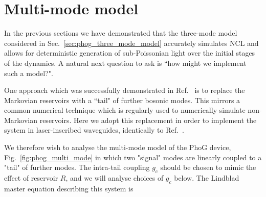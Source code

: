 



\clearpage
\section{Multi-mode model}\label{sec:phog_multi_mode}
In the previous sections we have demonstrated that the three-mode model considered in Sec.~\ref{sec:phog_three_mode_model} accurately simulates NCL and allows for deterministic generation of sub-Poissonian light over the initial stages of the dynamics. A natural next question to ask is ``how might we implement such a model?". 

One approach which was successfully demonstrated in Ref.~\cite{Mukherjee2017} is to replace the Markovian reservoirs with a ``tail" of further bosonic modes. This mirrors a common numerical technique  which is regularly used to numerically simulate non-Markovian reservoirs. Here we adopt this replacement in order to implement the system in laser-inscribed waveguides, identically to Ref.~\cite{Mukherjee}. 

We therefore wish to analyse the multi-mode model of the PhoG device, Fig.~\ref{fig:phog_multi_mode} in which two "signal" modes are linearly coupled to a "tail" of further modes. The intra-tail coupling $g_c$ should be chosen to mimic the effect of reservoir $R$, and we will analyse choices of $g_c$ below. The Lindblad master equation describing this system is

